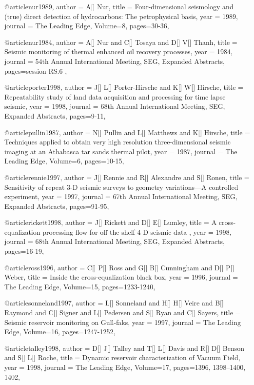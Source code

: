 @article{nur1989,
  author =	 {A[] Nur},
  title =	 {Four-dimensional seismology and (true) direct detection
of hydrocarbons: The petrophysical basis},
  year =	 1989,
  journal =	 {The Leading Edge},
    Volume=8,
 pages=30-36,
}

@article{nur1984,
  author =	 {A[] Nur and C[] Tosaya and D[] V[] Thanh},
  title =	 {Seismic monitoring of thermal enhanced oil recovery processes},
  year =	 1984,
  journal =	 {54th Annual International Meeting, SEG, Expanded Abstracts},
 pages=session RS.6
,
}

@article{porter1998,
  author =	 {J[] L[] Porter-Hirsche and K[] W[] Hirsche},
  title =	 {Repeatability study of land data acquisition and processing for time lapse seismic},
  year =	 1998,
  journal =	 {68th Annual International Meeting, SEG, Expanded Abstracts},
 pages=9-11,
}

@article{pullin1987,
  author =	 {N[] Pullin and L[] Matthews and K[] Hirsche},
  title =	 {Techniques applied to obtain very high resolution three-dimensional seismic imaging at an Athabasca tar sands thermal pilot},
  year =	 1987,
  journal =	 {The Leading Edge},
    Volume=6,
 pages=10-15,
}

@article{rennie1997,
  author =	 {J[] Rennie and R[] Alexandre and S[] Ronen},
  title =	 { Sensitivity of repeat 3-D seismic surveys to geometry variations—A controlled experiment},
  year =	 1997,
  journal =	 {67th Annual International Meeting, SEG, Expanded Abstracts},
 pages=91-95,
}

@article{rickett1998,
  author =	 {J[] Rickett and D[] E[] Lumley},
  title =	 { A cross-equalization processing flow for off-the-shelf 4-D seismic data },
  year =	 1998,
  journal =	 {68th Annual International Meeting, SEG, Expanded Abstracts},
 pages=16-19,
}

@article{ross1996,
  author =	 {C[] P[] Ross and G[] B[] Cunningham and D[] P[] Weber},
  title =	 {Inside the cross-equalization black box},
  year =	 1996,
  journal =	 {The Leading Edge},
    Volume=15,
 pages=1233-1240,
}

@article{sonneland1997,
  author =	 {L[] Sonneland and H[] H[] Veire and B[] Raymond and C[] Signer and L[] Pedersen and S[] Ryan and C[] Sayers},
  title =	 {Seismic reservoir monitoring on Gull-faks},
  year =	 1997,
  journal =	 {The Leading Edge},
    Volume=16,
 pages=1247-1252,
}

@article{talley1998,
  author =	 {D[] J[] Talley and T[] L[] Davis and R[] D[] Benson and S[] L[] Roche},
  title =	 {Dynamic reservoir characterization of Vacuum Field},
  year =	 1998,
  journal =	 {The Leading Edge},
    Volume=17,
 pages=1396, 1398–1400, 1402,
}

